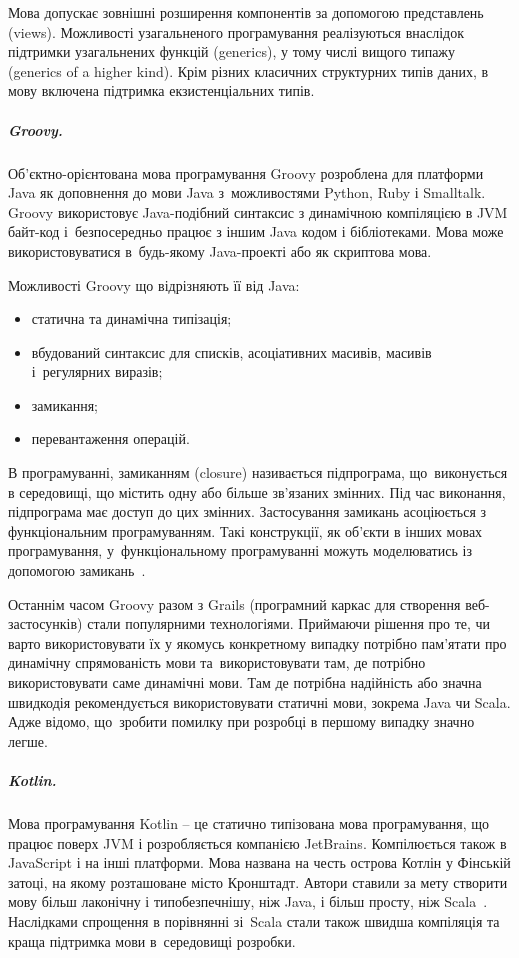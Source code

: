 \documentclass[../main.tex]{subfiles}
\begin{document}
Мова допускає зовнішні розширення компонентів за допомогою представлень (views). Можливості узагальненого програмування реалізуються внаслідок підтримки узагальнених функцій (generics), у тому числі вищого типажу (generics of a higher kind). Крім різних класичних структурних типів даних, в мову включена підтримка екзистенціальних типів.

\subparagraph{Groovy.}
Об'єктно-орієнтована мова програмування Groovy розроблена для платформи Java як доповнення до мови Java з~можливостями Python, Ruby і Smalltalk. Groovy використовує Java-подібний синтаксис з динамічною компіляцією в JVM байт-код і~безпосередньо працює з іншим Java кодом і бібліотеками. Мова може використовуватися в~будь-якому Java-проекті або як скриптова мова. 

Можливості Groovy що відрізняють її від Java:
\begin{itemize}[label={--}]
	\item статична та динамічна типізація;
	\item вбудований синтаксис для списків, асоціативних масивів, масивів і~регулярних виразів;
	\item замикання;
	\item перевантаження операцій.
\end{itemize}

В програмуванні, замиканням (closure) називається підпрограма, що~виконується в середовищі, що містить одну або більше зв'язаних змінних. Під час виконання, підпрограма має доступ до цих змінних. Застосування замикань асоціюється з функціональним програмуванням. Такі конструкції, як об'єкти в інших мовах програмування, у~функціональному програмуванні можуть моделюватись із допомогою замикань~\cite{groovy}.

Останнім часом Groovy разом з Grails (програмний каркас для створення веб-застосунків) стали популярними технологіями. Приймаючи рішення про те, чи варто використовувати їх у якомусь конкретному випадку потрібно пам’ятати про динамічну спрямованість мови та~використовувати там, де потрібно використовувати саме динамічні мови. Там де потрібна надійність або значна швидкодія рекомендується використовувати статичні мови, зокрема Java чи Scala. Адже відомо, що~зробити помилку при розробці в першому випадку значно легше.

\subparagraph{Kotlin.}
Мова програмування Kotlin -- це статично типізована мова програмування, що працює поверх JVM і розробляється компанією JetBrains. Компілюється також в JavaScript і на інші платформи. Мова названа на честь острова Котлін у Фінській затоці, на якому розташоване місто Кронштадт. Автори ставили за мету створити мову більш лаконічну і типобезпечнішу, ніж Java, і більш просту, ніж Scala~\cite{open_systems}. Наслідками спрощення в порівнянні зі~Scala стали також швидша компіляція та краща підтримка мови в~середовищі розробки.
\end{document}
